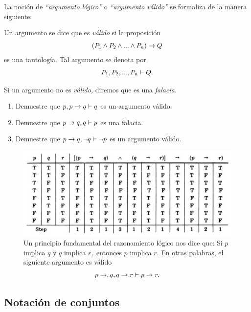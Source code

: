  La noción de \emph{``argumento lógico''} o \emph{``argumento válido''} se formaliza de la manera siguiente:
 
 \begin{definicion}
  \label{lip:4.4}
  Un argumento se dice que es \emph{válido} si la proposición 
  $$
  \left( P_{1} \wedge P_{2} \wedge...\wedge P_{n}\right) \rightarrow Q
  $$ es una tautología. 
  Tal argumento se denota por $$P_{1}, P_{2},...,P_{n} \vdash Q.$$
  
   Si un argumento no es \emph{válido,} diremos que es una \emph{falacia.}
 \end{definicion}




 \begin{resuelto}
 \label{lip:exmp:4.4}
  \begin{enumerate}
   \item Demuestre que $p, p\rightarrow q \vdash q$ es un argumento válido. 
   \item Demuestre que $p\rightarrow q, q \vdash p$ es una falacia.
   
   \item Demuestre que $p\rightarrow q, \neg q \vdash \neg p$ es un argumento válido.
  \end{enumerate}

 \end{resuelto}

	\begin{figure}
		\centering
		\includegraphics[width=0.7\linewidth]{md/tabla_silogismo}
		\caption{
			  Un principio fundamental del razonamiento lógico nos dice que:
				Si $p$ implica $q$ y $q$ implica $r,$ entonces $p$ implica $r.$ 
			En otras palabras, el siguiente argumento es válido
			$$
			p\rightarrow,q, q\rightarrow r \vdash p \rightarrow r.
			$$ }
		\label{fig:tabla_silogismo}
	\end{figure}

\subsection{Notación de conjuntos}

